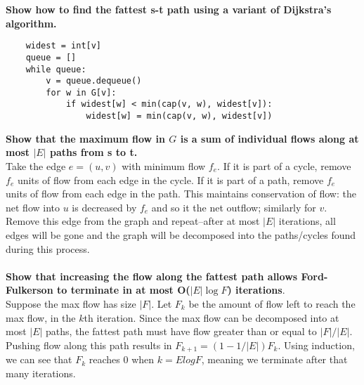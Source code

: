 \newpage
\begin{problem}{7.31}
\textbf{Show how to find the fattest s-t path using a variant of Dijkstra's algorithm.}
\begin{lstlisting}
    widest = int[v]
    queue = []
    while queue:
        v = queue.dequeue()
        for w in G[v]:
            if widest[w] < min(cap(v, w), widest[v]):
                widest[w] = min(cap(v, w), widest[v])
\end{lstlisting}

\textbf{Show that the maximum flow in $G$ is a sum of individual flows along at most $|E|$ paths from s to t.} \\
Take the edge $e = (u, v)$ with minimum flow $f_e$. If it is part of a cycle, remove $f_e$ units of flow from each edge in the cycle. If it is part of a path, remove $f_e$ units of flow from each edge in the path. This maintains conservation of flow: the net flow into $u$ is decreased by $f_e$ and so it the net outflow; similarly for $v$. Remove this edge from the graph and repeat--after at most $|E|$ iterations, all edges will be gone and the graph will be decomposed into the paths/cycles found during this process. \\ \\

\textbf{Show that increasing the flow along the fattest path allows Ford-Fulkerson to terminate in at most O($|E| \log F$) iterations}. \\
Suppose the max flow has size $|F|$. Let $F_k$ be the amount of flow left to reach the max flow, in the $k$th iteration. Since the max flow can be decomposed into at most $|E|$ paths, the fattest path must have flow greater than or equal to $|F| / |E|$. Pushing flow along this path results in $F_{k + 1} = (1 - 1 / |E|)F_k$. Using induction, we can see that $F_{k}$ reaches 0 when $k = E log F$, meaning we terminate after that many iterations.
\end{problem}
